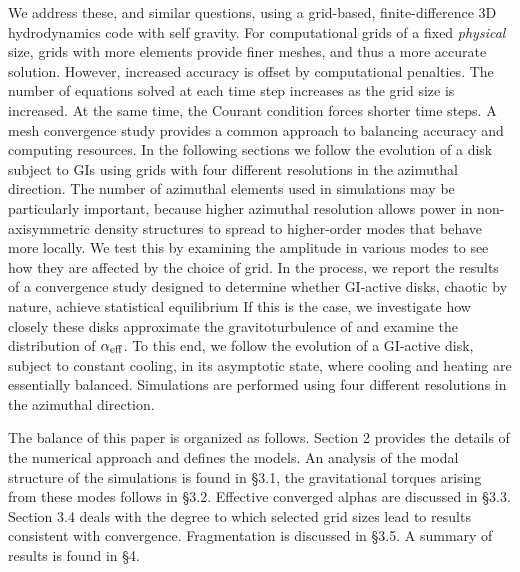 \documentclass[manuscript]{aastex}
\begin{document}
We address these, and similar questions, using a grid-based, finite-difference 3D hydrodynamics code
with self gravity.
For computational grids of a fixed {\it physical} size,
grids with more elements provide finer meshes, and thus a more accurate solution. 
However, increased accuracy is offset by computational penalties.
The number of equations solved at each time step 
increases as the grid size is increased.  At the same time, the Courant condition 
forces shorter time steps.  A mesh convergence study 
provides a common approach to balancing accuracy and computing resources.
In the following sections we follow the evolution of a disk subject to GIs
using grids with four different
resolutions in the azimuthal direction.  The number of azimuthal elements used in simulations
may be particularly important, because higher azimuthal resolution 
allows power in non-axisymmetric density structures to spread to higher-order modes 
that behave more locally. We test this by examining the amplitude in various 
modes to see how they are affected by the choice of grid.
In the process, 
we report the results of a convergence study designed to determine whether GI-active disks, chaotic by nature, achieve statistical equilibrium If this is the case, we investigate how closely these disks approximate the gravitoturbulence of \citet{gammie2001} and examine the distribution of $\alpha_{\rm{eff}}$. To this end, we follow the evolution of a GI-active disk, subject to constant cooling, in its asymptotic state, where cooling and heating are essentially balanced.  Simulations are performed using four different resolutions in the azimuthal direction.  

The balance of this paper is organized as follows.  Section 2 provides the details of the numerical approach and defines the models.  An analysis of the modal structure of the simulations 
is found in \S3.1, the gravitational torques arising from these modes follows in \S3.2.  Effective converged alphas are 
discussed in \S3.3.  Section 3.4 deals with the degree to which selected grid sizes lead to results consistent with
convergence.  Fragmentation is discussed in \S3.5.  A summary of results is found in \S4.

\end{document}

